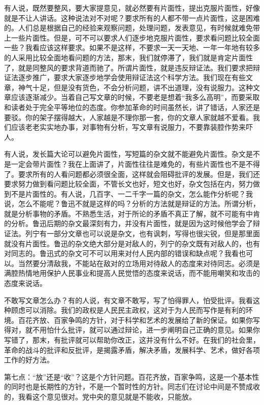 有人说，既然要整风，要大家提意见，就必然要有片面性，提出克服片面性，好像就是不让人讲话。这种说法对不对呢？要求所有的人都不带一点片面性，这是困难的。人们总是根据自己的经验来观察问题，处理问题，发表意见，有时候就难免带上一些片面性。但是，可不可以要求人们逐步地克服片面性，要求看问题比较全面一些？我看应该这样要求。如果不是这样，不要求一天一天地、一年一年地有较多的人采用比较全面地看问题的方法，那末，我们就停滞了，我们就是肯定片面性了，就是同整风的要求背道而驰了。所谓片面性，就是违反辩证法。我们要求把辩证法逐步推广，要求大家逐步地学会使用辩证法这个科学方法。我们现在有些文章，神气十足，但是没有货色，不会分析问题，讲不出道理，没有说服力。这种文章应该逐渐减少。当着自己写文章的时候，不要老是想着“我多么高明”，而要采取和读者处于完全平等地位的态度。你参加革命的时间虽然长，讲了错话，人家还是要驳。你的架子摆得越大，人家越是不理你那一套，你的文章人家就越不爱看。我们应该老老实实地办事，对事物有分析，写文章有说服力，不要靠装腔作势来吓人。

有人说，发长篇大论可以避免片面性，写短篇的杂文就不能避免片面性。杂文是不是一定会带片面性？我在上面讲了，片面性往往是难免的，有些片面性也不是不得了。要求所有的人看问题都必须很全面，这样就会阻碍批评的发展。但是，我们还要求努力做到看问题比较全面，不管长文也好，短文也好，杂文包括在内，努力做到不是片面性的。有人说，几百字、一二千字一篇的杂文，怎么能作分析呢？我说，怎么不能呢？鲁迅不就是这样的吗？分析的方法就是辩证的方法。所谓分析，就是分析事物的矛盾。不熟悉生活，对于所论的矛盾不真正了解，就不可能有中肯的分析。鲁迅后期的杂文最深刻有力，并没有片面性，就是因为这时候他学会了辩证法。列宁有一部分文章也可以说是杂文，也有讽刺，写得也很尖锐，但是那里面就没有片面性。鲁迅的杂文绝大部分是对敌人的，列宁的杂文既有对敌人的，也有对同志的。鲁迅式的杂文可不可以用来对付人民内部的错误和缺点呢？我看也可以。当然要分清敌我，不能站在敌对的立场用对待敌人的态度来对待同志。必须是满腔热情地用保护人民事业和提高人民觉悟的态度来说话，而不能用嘲笑和攻击的态度来说话。

不敢写文章怎么办？有的人说，有文章不敢写，写了怕得罪人，怕受批评。我看这种顾虑可以消除。我们的政权是人民民主政权，这对于为人民而写作是有利的环境。百花齐放、百家争鸣的方针，对于科学和艺术的发展给了新的保证。如果你写得对，就不用怕什么批评，就可以通过辩论，进一步阐明自己正确的意见。如果你写错了，那末，有批评就可以帮助你改正，这并没有什么不好。在我们的社会里，革命的战斗的批评和反批评，是揭露矛盾，解决矛盾，发展科学、艺术，做好各项工作的好方法。

第七点：“放”还是“收”？这是个方针问题。百花齐放，百家争鸣，这是一个基本性的同时也是长期性的方针，不是一个暂时性的方针。同志们在讨论中间是不赞成收的，我看这个意见很对。党中央的意见就是不能收，只能放。

